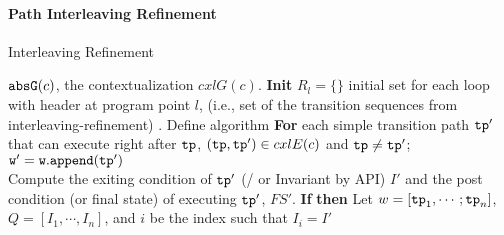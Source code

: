 \paragraph{Path Interleaving Refinement}
\begin{algorithm}
  \caption{
  {Interleaving Refinement}
  \label{alg:path-refine}
  }
  \begin{algorithmic}[1]
  \REQUIRE $\mathtt{abs}{\mathtt{G}}(c)$, the contextualization $cxlG(c)$.
  \STATE  \textbf{Init} 
  $R_l = \{\}$ initial set for each loop with header at program point $l$, (i.e., set of the transition sequences from interleaving-refinement) .
  \STATE Define algorithm 
  \STATE {}
  \STATE \quad \textbf{For} each simple transition path $\mathtt{tp}'$ that can execute right after $\mathtt{tp}$,
  $(\mathtt{tp}, \mathtt{tp}') \in cxlE(c)$ and $\mathtt{tp} \neq \mathtt{tp}'$;
  \\
  \STATE \quad \quad $\mathtt{w' = w.append(\mathtt{tp}')}$
  \\
  \quad \quad {}
  \STATE  \quad \quad Compute the exiting condition of $\mathtt{tp}'$ (/ or Invariant by  API) $I'$ and the 
  post condition (or final state) of executing $\mathtt{tp}'$, $FS'$.
  \STATE \quad \quad \textbf{If} 
  \STATE \quad \quad \textbf{then}
  Let $w = [\mathtt{tp}_1, \cdots; \mathtt{tp}_n]$, $Q = [I_1, \cdots, I_n]$, and $i$ be the index such that $I_i = I'$
  \\ \quad \quad \quad \quad \quad

\end{algorithmic}
\end{algorithm}
